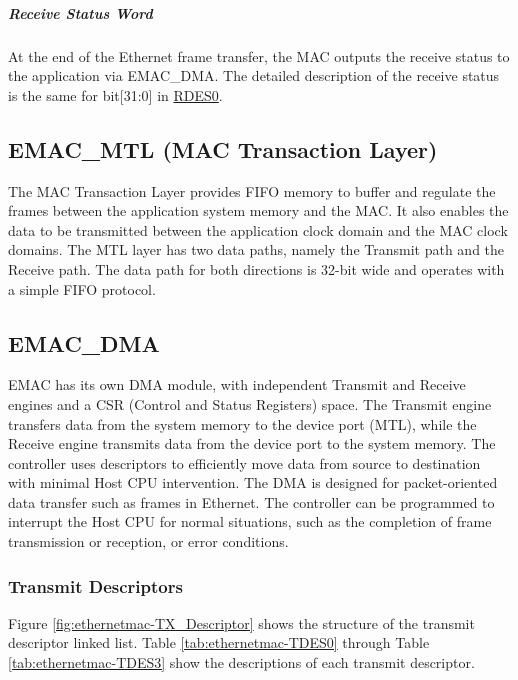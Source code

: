 \documentclass[main\_\_EN.tex]{subfiles}
\begin{document}
\subparagraph{Receive Status Word}
At the end of the Ethernet frame transfer, the MAC outputs the receive status to the application via EMAC\_DMA. The detailed description of the receive status is the same for bit[31:0] in \hyperref[tab:ethernetmac-RDES0]{RDES0}.

\subsection{EMAC\_MTL (MAC Transaction Layer)}
The MAC Transaction Layer provides FIFO memory to buffer and regulate the frames between the application system memory and the MAC. It also enables the data to be transmitted between the application clock domain and the MAC clock domains. The MTL layer has two data paths, namely the Transmit path and the Receive path. The data path for both directions is 32-bit wide and operates with a simple FIFO protocol.

\subsection{EMAC\_DMA}
EMAC has its own DMA module, with independent Transmit and Receive engines and a CSR (Control and Status Registers) space. The Transmit engine transfers data from the system memory to the device port (MTL), while the Receive engine transmits data from the device port to the system memory. The controller uses descriptors to efficiently move data from source to destination with minimal Host CPU intervention. The DMA is designed for packet-oriented data transfer such as frames in Ethernet. The controller can be programmed to interrupt the Host CPU for normal situations, such as the completion of frame transmission or reception, or error conditions.

\subsubsection{Transmit Descriptors}
Figure \ref{fig:ethernetmac-TX_Descriptor} shows the structure of the transmit descriptor linked list. Table \ref{tab:ethernetmac-TDES0} through Table \ref{tab:ethernetmac-TDES3} show the descriptions of each transmit descriptor.
\end{document}
